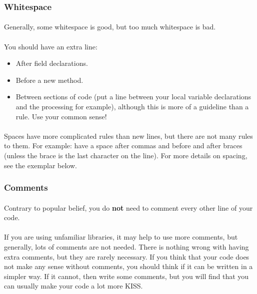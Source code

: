 \documentclass[12pt, letterpaper]{article}
\begin{document}
			\subsubsection{Whitespace}
				\paragraph{}
					Generally, some whitespace is good, but too much whitespace is bad.
				\paragraph{}
					You should have an extra line:
					\begin{itemize}
						\item After field declarations.
						\item Before a new method.
						\item Between sections of code (put a line between your local variable declarations and the processing for example), although this is more of a guideline than a rule. Use your common sense!
					\end{itemize}
				\paragraph{}
					Spaces have more complicated rules than new lines, but there are not many rules to them. For example: have a space after commas and before and after braces (unless the brace is the last character on the line). For more details on spacing, see the exemplar below.
			\subsubsection{Comments}
				\paragraph{}
					Contrary to popular belief, you do \textbf{not} need to comment every other line of your code.
				\paragraph{}
					If you are using unfamiliar libraries, it may help to use more comments, but generally, lots of comments are not needed. There is nothing wrong with having extra comments, but they are rarely necessary. If you think that your code does not make any sense without comments, you should think if it can be written in a simpler way. If it cannot, then write some comments, but you will find that you can usually make your code a lot more KISS.
\end{document}
